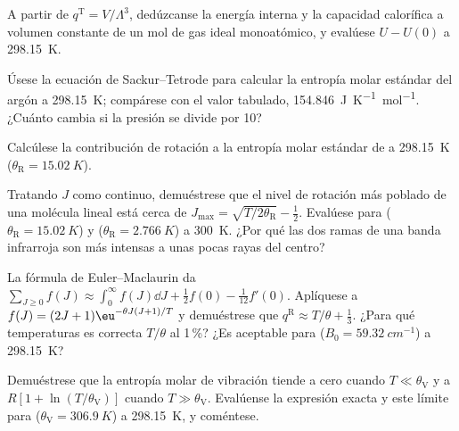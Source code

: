 \begin{exercise}[$\star\star$]\label{exo:b3:partition-functions:7}
A partir de $q^{\mathrm T} = V/\Lambda^3$, dedúzcanse la energía interna y la capacidad calorífica a
volumen constante de un mol de gas ideal monoatómico, y evalúese $U - U(0)$ a
\qty{298.15}{K}.
\end{exercise}

\begin{exercise}[$\star\star$]\label{exo:b3:partition-functions:8}
Úsese la ecuación de Sackur--Tetrode para calcular la entropía molar estándar del
argón a \qty{298.15}{K}; compárese con el valor tabulado,
\qty{154.846}{J.K^{-1}.mol^{-1}}. ¿Cuánto cambia si la presión se divide por 10?
\end{exercise}

\begin{exercise}[$\star\star$]\label{exo:b3:partition-functions:9}
Calcúlese la contribución de rotación a la entropía molar estándar de
 a \qty{298.15}{K} ($\theta_{\mathrm R} = \qty{15.02}{K}$).
\end{exercise}

\begin{exercise}[$\star\star\star$]\label{exo:b3:partition-functions:10}
Tratando $J$ como continuo, demuéstrese que el nivel de rotación más poblado de una
molécula lineal está cerca de $J_{\max} = \sqrt{T/2\theta_{\mathrm R}} - \frac12$. Evalúese para 
($\theta_{\mathrm R} = \qty{15.02}{K}$) y  ($\theta_{\mathrm R} = \qty{2.766}{K}$) a \qty{300}{K}. ¿Por qué las dos
ramas de una banda infrarroja son más intensas a unas pocas rayas del centro?
\end{exercise}

\begin{exercise}[$\star\star\star$]\label{exo:b3:partition-functions:11}
La fórmula de Euler--Maclaurin da $\sum_{J\ge0}f(J) \approx \int_0^\infty f(J)\dd J + \frac12f(0) -
\frac1{12}f'(0)$. Aplíquese a $f(J) = (2J+1)\eu^{-\theta J(J+1)/T}$ y demuéstrese que $q^{\mathrm R} \approx T/\theta +
\frac13$. ¿Para qué temperaturas es correcta $T/\theta$ al 1\,\%? ¿Es aceptable para 
($B_0 = \qty{59.32}{cm^{-1}}$) a \qty{298.15}{K}?
\end{exercise}

\begin{exercise}[$\star\star\star$]\label{exo:b3:partition-functions:12}
Demuéstrese que la entropía molar de vibración tiende a cero cuando $T \ll \theta_{\mathrm V}$ y a
$R[1 + \ln(T/\theta_{\mathrm V})]$ cuando $T \gg \theta_{\mathrm V}$. Evalúense la expresión exacta y este
límite para  ($\theta_{\mathrm V} = \qty{306.9}{K}$) a \qty{298.15}{K}, y coméntese.
\end{exercise}

